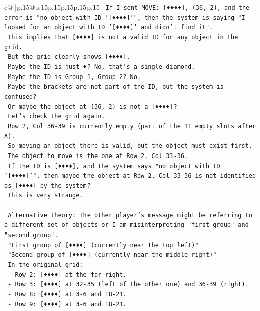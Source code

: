 \documentclass{article}
\begin{document}
{\begin{supertabular}{c@{$\;$}|p{.15\linewidth}@{}p{.15\linewidth}p{.15\linewidth}p{.15\linewidth}p{.15\linewidth}p{.15\linewidth}}
{{{\texttt{    If I sent MOVE: {[}♦♦♦♦{]}, (36, 2), and the error is "no object with ID '{[}♦♦♦♦{]}'", then the system is saying "I looked for an object with ID '{[}♦♦♦♦{]}' and didn't find it".} \\
\texttt{    This implies that {[}♦♦♦♦{]} is not a valid ID for any object in the grid.} \\
\texttt{    But the grid clearly shows {[}♦♦♦♦{]}.} \\
\texttt{    Maybe the ID is just ♦? No, that's a single diamond.} \\
\texttt{    Maybe the ID is Group 1, Group 2? No.} \\
\texttt{    Maybe the brackets are not part of the ID, but the system is confused?} \\
\texttt{    Or maybe the object at (36, 2) is not a {[}♦♦♦♦{]}?} \\
\texttt{    Let's check the grid again.} \\
\texttt{    Row 2, Col 36{-}39 is currently empty (part of the 11 empty slots after A).} \\
\texttt{    So moving an object there is valid, but the object must exist first.} \\
\texttt{    The object to move is the one at Row 2, Col 33{-}36.} \\
\texttt{    If the ID is {[}♦♦♦♦{]}, and the system says "no object with ID '{[}♦♦♦♦{]}'", then maybe the object at Row 2, Col 33{-}36 is not identified as {[}♦♦♦♦{]} by the system?} \\
\texttt{    This is very strange.} \\
\\ 
\texttt{    Alternative theory: The other player's message might be referring to a different set of objects or I am misinterpreting "first group" and "second group".} \\
\texttt{    "First group of {[}♦♦♦♦{]} (currently near the top left)"} \\
\texttt{    "Second group of {[}♦♦♦♦{]} (currently near the middle right)"} \\
\texttt{    In the original grid:} \\
\texttt{    {-} Row 2: {[}♦♦♦♦{]} at the far right.} \\
\texttt{    {-} Row 3: {[}♦♦♦♦{]} at 32{-}35 (left of the other one) and 36{-}39 (right).} \\
\texttt{    {-} Row 8: {[}♦♦♦♦{]} at 3{-}6 and 18{-}21.} \\
\texttt{    {-} Row 9: {[}♦♦♦♦{]} at 3{-}6 and 18{-}21.} \\
}}}
\end{supertabular}}
\end{document}
